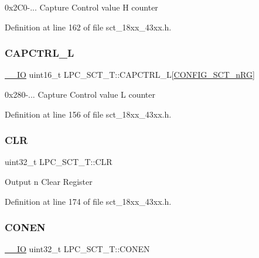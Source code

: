 0x2\+C0-\/... Capture Control value H counter 

Definition at line 162 of file sct\+\_\+18xx\+\_\+43xx.\+h.

\mbox{\label{struct_l_p_c___s_c_t___t_a476a3e974b4e00de2123dfcba1ca2328}} 
\subsubsection{\texorpdfstring{C\+A\+P\+C\+T\+R\+L\+\_\+L}{CAPCTRL\_L}}
{\footnotesize\ttfamily \hyperlink{core__sc300_8h_aec43007d9998a0a0e01faede4133d6be}{\+\_\+\+\_\+\+IO} uint16\+\_\+t L\+P\+C\+\_\+\+S\+C\+T\+\_\+\+T\+::\+C\+A\+P\+C\+T\+R\+L\+\_\+L\mbox{[}\hyperlink{group___s_c_t__18_x_x__43_x_x_ga8d80e251208a01483a6b00c81ecb7493}{C\+O\+N\+F\+I\+G\+\_\+\+S\+C\+T\+\_\+n\+RG}\mbox{]}}

0x280-\/... Capture Control value L counter 

Definition at line 156 of file sct\+\_\+18xx\+\_\+43xx.\+h.

\mbox{\label{struct_l_p_c___s_c_t___t_a68f907ea063e2e53e77a943f23514b3a}} 
\subsubsection{\texorpdfstring{C\+LR}{CLR}}
{\footnotesize\ttfamily uint32\+\_\+t L\+P\+C\+\_\+\+S\+C\+T\+\_\+\+T\+::\+C\+LR}

Output n Clear Register 

Definition at line 174 of file sct\+\_\+18xx\+\_\+43xx.\+h.

\mbox{\label{struct_l_p_c___s_c_t___t_a594680b4be50db4bd8888f8e5791339c}} 
\subsubsection{\texorpdfstring{C\+O\+N\+EN}{CONEN}}
{\footnotesize\ttfamily \hyperlink{core__sc300_8h_aec43007d9998a0a0e01faede4133d6be}{\+\_\+\+\_\+\+IO} uint32\+\_\+t L\+P\+C\+\_\+\+S\+C\+T\+\_\+\+T\+::\+C\+O\+N\+EN}


